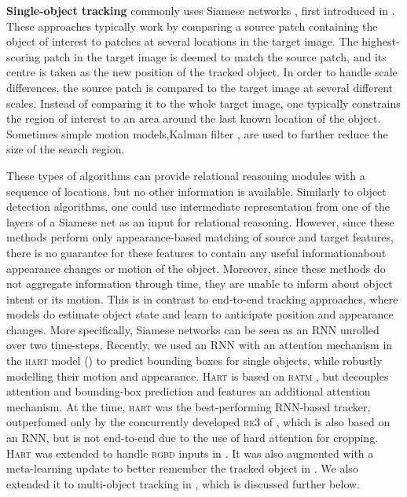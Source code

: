 %	
%
	\textbf{Single-object tracking} commonly uses Siamese networks \citep{Valmadre2017,Held2016goturn}, first introduced in \citep{Bromley1993siamese,Schmidhuber1993dicovering}.
	These approaches typically work by comparing a source patch containing the object of interest to patches at several locations in the target image.
	The highest-scoring patch in the target image is deemed to match the source patch, and its centre is taken as the new position of the tracked object.
	In order to handle scale differences, the source patch is compared to the target image at several different scales.
	Instead of comparing it to the whole target image, one typically constrains the region of interest to an area around the last known location of the object.
	Sometimes simple motion models,\eg Kalman filter  \citep{Swerling1959kalman,Kalman1961kalman}, are used to further reduce the size of the search region.
	
	These types of algorithms can provide relational reasoning modules with a sequence of locations, but no other information is available.
	Similarly to object detection algorithms, one could use intermediate representation from one of the layers of a Siamese net as an input for relational reasoning.
	However, since these methods perform only appearance-based matching of source and target features, there is no guarantee for these features to contain any useful information\eg about appearance changes or motion of the object.
	Moreover, since these methods do not aggregate information through time, they are unable to inform about object intent or its motion.
	This is in contrast to end-to-end tracking approaches, where models do estimate object state and learn to anticipate position and appearance changes.
	More specifically, Siamese networks can be seen as an \gls{RNN} unrolled over two time-steps.
	Recently, we used an \gls{RNN} with an attention mechanism in the \textsc{hart} model () to predict bounding boxes for single objects, while robustly modelling their motion and appearance.
	\textsc{Hart} is based on \textsc{ratm} \citep{Kahou2015ratm}, but decouples attention and bounding-box prediction and features an additional attention mechanism.
	At the time, \textsc{hart} was the best-performing \gls{RNN}-based tracker, outperfomed only by the concurrently developed \textsc{re3} of \cite{Gordon2018re3}, which is also based on an \gls{RNN}, but is not end-to-end due to the use of hard attention for cropping.
	\textsc{Hart} was extended to handle \textsc{rgbd} inputs in \cite{Danesh2019deep}. 
	It was also augmented with a meta-learning update to better remember the tracked object in \cite{Li2019metahart}. We also extended it to multi-object tracking in , which is discussed further below.
	

